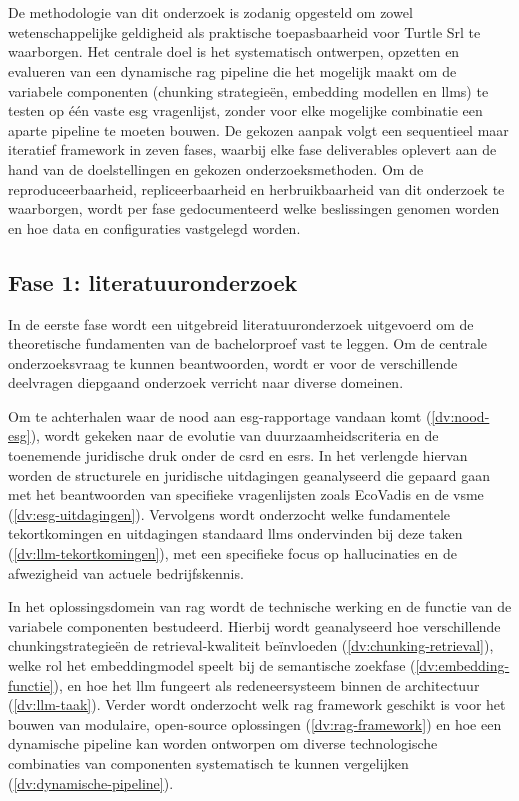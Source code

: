 \chapter{}%
\label{ch:methodologie}

De methodologie van dit onderzoek is zodanig opgesteld om zowel wetenschappelijke geldigheid als praktische toepasbaarheid voor Turtle Srl te waarborgen. Het centrale doel is het systematisch ontwerpen, opzetten en evalueren van een dynamische \gls{rag} pipeline die het mogelijk maakt om de  variabele componenten (chunking strategieën, embedding modellen en \glspl{llm}) te testen op één vaste \gls{esg} vragenlijst, zonder voor elke mogelijke combinatie een aparte pipeline te moeten bouwen. De gekozen aanpak volgt een sequentieel maar iteratief framework in zeven fases, waarbij elke fase deliverables oplevert aan de hand van de doelstellingen en gekozen onderzoeksmethoden. Om de reproduceerbaarheid, repliceerbaarheid en herbruikbaarheid van dit onderzoek te waarborgen, wordt per fase gedocumenteerd welke beslissingen genomen worden en hoe data en configuraties vastgelegd worden.

\section{Fase 1: literatuuronderzoek}

In de eerste fase wordt een uitgebreid literatuuronderzoek uitgevoerd om de theoretische fundamenten van de bachelorproef vast te leggen. Om de centrale onderzoeksvraag te kunnen beantwoorden, wordt er voor de verschillende deelvragen diepgaand onderzoek verricht naar diverse domeinen.

Om te achterhalen waar de nood aan \gls{esg}-rapportage vandaan komt (\ref{dv:nood-esg}), wordt gekeken naar de evolutie van duurzaamheidscriteria en de toenemende juridische druk onder de \gls{csrd} en \gls{esrs}. In het verlengde hiervan worden de structurele en juridische uitdagingen geanalyseerd die gepaard gaan met het beantwoorden van specifieke vragenlijsten zoals EcoVadis en de \gls{vsme} (\ref{dv:esg-uitdagingen}). Vervolgens wordt onderzocht welke fundamentele tekortkomingen en uitdagingen standaard \glspl{llm} ondervinden bij deze taken (\ref{dv:llm-tekortkomingen}), met een specifieke focus op hallucinaties en de afwezigheid van actuele bedrijfskennis.

In het oplossingsdomein van \gls{rag} wordt de technische werking en de functie van de variabele componenten bestudeerd. Hierbij wordt geanalyseerd hoe verschillende chunkingstrategieën de retrieval-kwaliteit beïnvloeden (\ref{dv:chunking-retrieval}), welke rol het embeddingmodel speelt bij de semantische zoekfase (\ref{dv:embedding-functie}), en hoe het \gls{llm} fungeert als redeneersysteem binnen de architectuur (\ref{dv:llm-taak}). Verder wordt onderzocht welk \gls{rag} framework geschikt is voor het bouwen van modulaire, open-source oplossingen (\ref{dv:rag-framework}) en hoe een dynamische pipeline kan worden ontworpen om diverse technologische combinaties van componenten systematisch te kunnen vergelijken (\ref{dv:dynamische-pipeline}).

